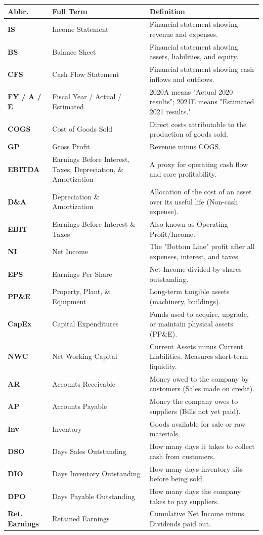 \documentclass[11pt, letterpaper]{article}
\begin{document}
\begin{longtable}{@{}p{} p{} p{}@{}}
\toprule
\textbf{Abbr.} & \textbf{Full Term} & \textbf{Definition} \\
\midrule
\endhead

\textbf{IS} & Income Statement & Financial statement showing revenue and expenses. \\
\textbf{BS} & Balance Sheet & Financial statement showing assets, liabilities, and equity. \\
\textbf{CFS} & Cash Flow Statement & Financial statement showing cash inflows and outflows. \\
\textbf{FY / A / E} & Fiscal Year / Actual / Estimated & 2020A means "Actual 2020 results"; 2021E means "Estimated 2021 results." \\
\textbf{COGS} & Cost of Goods Sold & Direct costs attributable to the production of goods sold. \\
\textbf{GP} & Gross Profit & Revenue minus COGS. \\
\textbf{EBITDA} & Earnings Before Interest, Taxes, Depreciation, \& Amortization & A proxy for operating cash flow and core profitability. \\
\textbf{D\&A} & Depreciation \& Amortization & Allocation of the cost of an asset over its useful life (Non-cash expense). \\
\textbf{EBIT} & Earnings Before Interest \& Taxes & Also known as Operating Profit/Income. \\
\textbf{NI} & Net Income & The "Bottom Line" profit after all expenses, interest, and taxes. \\
\textbf{EPS} & Earnings Per Share & Net Income divided by shares outstanding. \\
\textbf{PP\&E} & Property, Plant, \& Equipment & Long-term tangible assets (machinery, buildings). \\
\textbf{CapEx} & Capital Expenditures & Funds used to acquire, upgrade, or maintain physical assets (PP\&E). \\
\textbf{NWC} & Net Working Capital & Current Assets minus Current Liabilities. Measures short-term liquidity. \\
\textbf{AR} & Accounts Receivable & Money owed to the company by customers (Sales made on credit). \\
\textbf{AP} & Accounts Payable & Money the company owes to suppliers (Bills not yet paid). \\
\textbf{Inv} & Inventory & Goods available for sale or raw materials. \\
\textbf{DSO} & Days Sales Outstanding & How many days it takes to collect cash from customers. \\
\textbf{DIO} & Days Inventory Outstanding & How many days inventory sits before being sold. \\
\textbf{DPO} & Days Payable Outstanding & How many days the company takes to pay suppliers. \\
\textbf{Ret. Earnings} & Retained Earnings & Cumulative Net Income minus Dividends paid out. \\
\bottomrule
\end{longtable}
\end{document}
